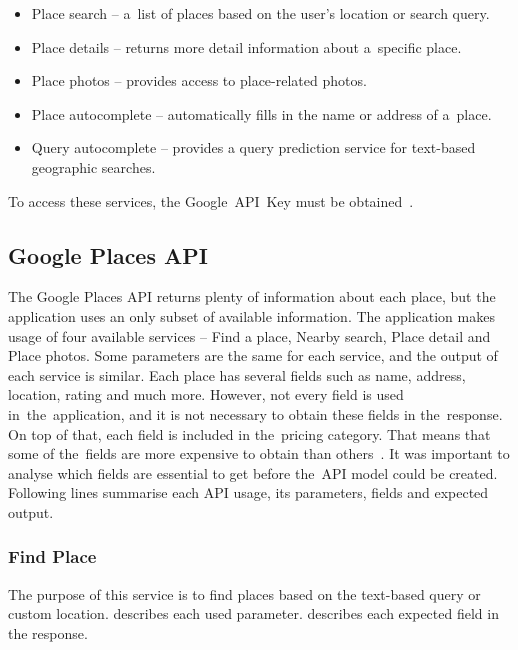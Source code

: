 \begin{itemize}
    \item Place search -- a~list of places based on the user's location or search query.
    \item Place details -- returns more detail information about a~specific place.
    \item Place photos -- provides access to place-related photos.
    \item Place autocomplete -- automatically fills in the name or address of a~place.
    \item Query autocomplete -- provides a query prediction service for text-based geographic searches.
\end{itemize}

To access these services, the Google~API~Key must be obtained~\cite{google-places-api-key}.
\subsection{Google Places API}
The Google Places API returns plenty of information about each place, but the application uses an only subset of available information. The application makes usage of four available services -- Find a place, Nearby search, Place detail and Place photos. Some parameters are the same for each service, and the output of each service is similar. 
Each place has several fields such as name, address, location, rating and much more. However, not every field is used in~the~application, and it is not necessary to obtain these fields in the~response. On top of that, each field is included in the~pricing category. That means that some of the~fields are more expensive to obtain than others~\cite{google-places-api-billing}. It was important to analyse which fields are essential to get before the~API model could be created. Following lines summarise each API usage, its parameters, fields and expected output.
\subsubsection{Find Place}
The purpose of this service is to find places based on the text-based query or custom location.  describes each used parameter.  describes each expected field in the response. 

